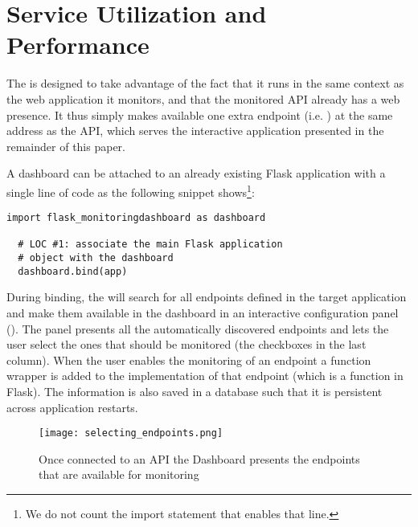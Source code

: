 

  \section{Service Utilization and Performance}
  \label{sec:utilandperf}


  The \tool is designed to take advantage of the fact that it runs in the same context as the web application it monitors, and that the monitored API already has a web presence. It thus simply makes available one extra endpoint (i.e. ) at the same address as the API, which serves the interactive application presented in the remainder of this paper. 

  A dashboard can be attached to an already existing Flask application with a single line of code \citationwithheld as the following snippet shows\footnote{We do not count the import statement that enables that line.}:


  \begin{lstlisting}[style=custompython]
  import flask_monitoringdashboard as dashboard

  # LOC #1: associate the main Flask application 
  # object with the dashboard
  dashboard.bind(app) 

  \end{lstlisting}

  During binding, the \tool will search for all endpoints defined in the target application and make them available in the dashboard in an interactive configuration panel (). The panel presents all the automatically discovered endpoints and lets the user select the ones that should be monitored (the checkboxes in the last column). When the user enables the monitoring of an endpoint a function wrapper is added to the implementation of that endpoint (which is a function in Flask). The information is also saved in a database such that it is persistent across application restarts. 


    \begin{figure}[h]
      \centering
      \texttt{[image: selecting\_endpoints.png]}
      \caption{Once connected to an API the Dashboard presents the endpoints that are available for monitoring}
      \label{fig:sep}
    \end{figure}

